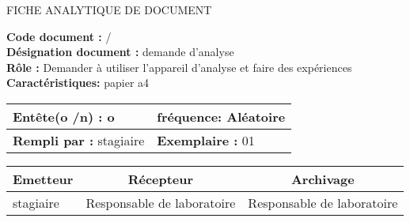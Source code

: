 

\newpage

\begin{center}
\Huge FICHE ANALYTIQUE DE DOCUMENT
\end{center}

\vspace{0.5cm}
    

\begin{flushleft}
\textbf{Code document :} / \\
\textbf{Désignation document :} demande d'analyse \\
\textbf{Rôle :}  Demander à utiliser l'appareil d'analyse et faire des expériences\\
\textbf{Caractéristiques:} papier a4 \\
\end{flushleft}

\vspace{1cm}

\begin{table}[ht]
\begin{tabularx}{\textwidth}{|X|X|}

\hline
\textbf{Entête(o /n) :}  o   & \textbf{fréquence:} Aléatoire  \\
\hline
\textbf{Rempli par :}  stagiaire    & \textbf{Exemplaire :} 01  \\
\hline
\end{tabularx}
\end{table}

\vspace{1cm}

\begin{table}[ht]
\begin{tabularx}{\textwidth}{|X|X|X|}
  \hline
  \multicolumn{1}{|c|}{\centering\textbf{Emetteur}} & \multicolumn{1}{c|}{\centering\textbf{Récepteur}} & \multicolumn{1}{c|}{\centering\textbf{Archivage}} \\
  \hline
  stagiaire & Responsable de laboratoire & Responsable de laboratoire \\
  \hline
\end{tabularx}
\end{table}

\vspace{1cm}

